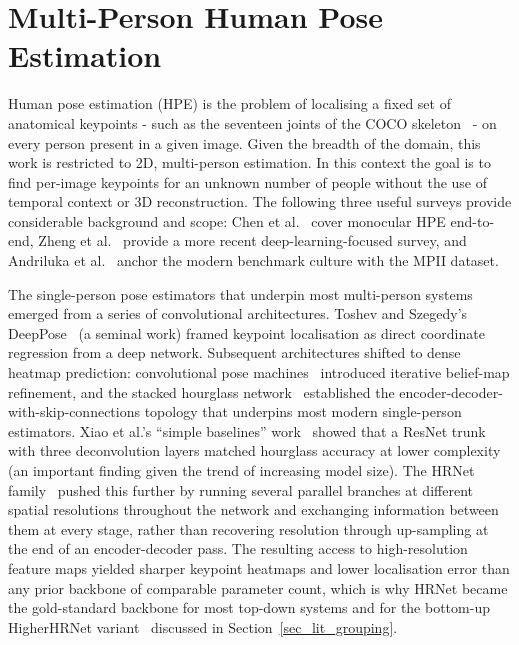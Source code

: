 \section{Multi-Person Human Pose Estimation}
\label{sec_lit_hpe}

Human pose estimation (HPE) is the problem of localising a fixed set of
anatomical keypoints - such as the seventeen joints of the COCO
skeleton~\cite{lin2014coco} - on every person present in a given image.
Given the breadth of the domain, this work is restricted 
to 2D, multi-person estimation.
In this context the goal is to find per-image keypoints
for an unknown number of people without the use of temporal context
or 3D reconstruction.
The following three useful surveys provide considerable background and scope:
Chen et al.~\cite{chen2022hpesurvey} cover monocular HPE end-to-end,
Zheng et al.~\cite{zheng2023hpesurvey} provide a more recent
deep-learning-focused survey, and Andriluka et al.~\cite{andriluka2014mpii}
anchor the modern benchmark culture with the MPII dataset.

The single-person pose estimators that underpin most multi-person systems
emerged from a series of convolutional architectures.
Toshev and Szegedy's DeepPose~\cite{toshev2014deeppose} (a seminal work) framed
keypoint localisation as direct coordinate regression from a deep
network.
Subsequent architectures shifted to dense heatmap prediction:
convolutional pose machines~\cite{wei2016cpm} introduced iterative
belief-map refinement, and the stacked hourglass
network~\cite{newell2016hourglass} established the
encoder-decoder-with-skip-connections topology that underpins most
modern single-person estimators.
Xiao et al.'s ``simple baselines'' work~\cite{xiao2018simplebaselines}
showed that a ResNet trunk with three deconvolution layers matched
hourglass accuracy at lower complexity (an important finding given the trend of increasing model size).
The HRNet family~\cite{sun2019hrnet} pushed this further by running
several parallel branches at different spatial resolutions throughout
the network and exchanging information between them at every stage,
rather than recovering resolution through up-sampling at the end of an
encoder-decoder pass.
The resulting access to high-resolution feature maps yielded
sharper keypoint heatmaps and lower localisation error than any prior
backbone of comparable parameter count, which is why HRNet became the
gold-standard backbone for most top-down systems and for the bottom-up
HigherHRNet variant~\cite{cheng2020higherhrnet} discussed in
Section~\ref{sec_lit_grouping}.

